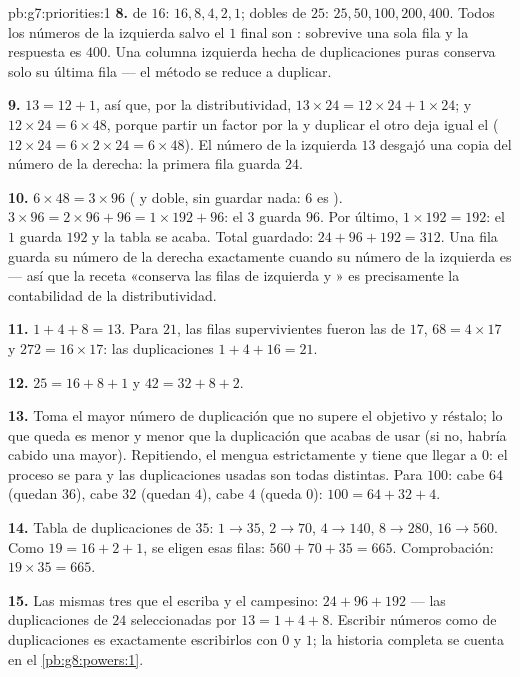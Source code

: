 \begin{solution}{pb:g7:priorities:1}
\textbf{8.}  de $16$: $16, 8, 4, 2, 1$; dobles de $25$:
$25, 50, 100, 200, 400$. Todos los números de la izquierda salvo el $1$ final
son : sobrevive una sola fila y la respuesta es $400$. Una columna
izquierda hecha de duplicaciones puras conserva solo su última fila --- el
método se reduce a duplicar.

\textbf{9.} $13 = 12 + 1$, así que, por la distributividad,
$13 \times 24 = 12 \times 24 + 1 \times 24$; y
$12 \times 24 = 6 \times 48$, porque partir un factor por la  y
duplicar el otro deja igual el 
($12 \times 24 = 6 \times 2 \times 24 = 6 \times 48$). El número de la izquierda
 $13$ desgajó una copia del número de la derecha: la
primera fila guarda $24$.

\textbf{10.} $6 \times 48 = 3 \times 96$ ( y doble, sin
guardar nada: $6$ es ). $3 \times 96 = 2 \times 96 + 96 =
1 \times 192 + 96$: el $3$  guarda $96$. Por último,
$1 \times 192 = 192$: el $1$  guarda $192$ y la tabla
se acaba. Total guardado: $24 + 96 + 192 = 312$. Una fila guarda su
número de la derecha exactamente cuando su número de la izquierda es  --- así que la
receta «conserva las filas de izquierda  y » es precisamente la
contabilidad de la distributividad.

\textbf{11.} $1 + 4 + 8 = 13$. Para $21$, las filas supervivientes fueron
las de $17$, $68 = 4 \times 17$ y $272 = 16 \times 17$: las
duplicaciones $1 + 4 + 16 = 21$.

\textbf{12.} $25 = 16 + 8 + 1$ y $42 = 32 + 8 + 2$.

\textbf{13.} Toma el mayor número de duplicación que no supere el
objetivo y réstalo; lo que queda es menor y menor
que la duplicación que acabas de usar (si no, habría cabido una
mayor). Repitiendo, el  mengua estrictamente
y tiene que llegar a $0$: el proceso se para y las duplicaciones usadas
son todas distintas. Para $100$: cabe $64$ (quedan $36$), cabe $32$
(quedan $4$), cabe $4$ (queda $0$): $100 = 64 + 32 + 4$.

\textbf{14.} Tabla de duplicaciones de $35$: $1 \to 35$, $2 \to 70$,
$4 \to 140$, $8 \to 280$, $16 \to 560$. Como
$19 = 16 + 2 + 1$, se eligen esas filas:
$560 + 70 + 35 = 665$. Comprobación: $19 \times 35 = 665$.

\textbf{15.} Las mismas tres que el escriba y el campesino:
$24 + 96 + 192$ --- las duplicaciones de $24$ seleccionadas por
$13 = 1 + 4 + 8$. Escribir números como  de duplicaciones es
exactamente escribirlos con $0$ y $1$; la historia completa se cuenta
en el \cref{pb:g8:powers:1}.
\end{solution}
